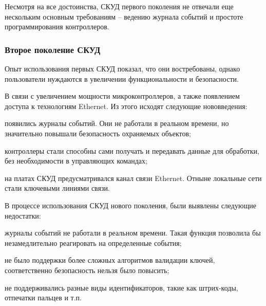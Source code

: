 Несмотря на все достоинства, СКУД первого поколения не отвечали еще нескольким основным требованиям -- ведению журнала событий и простоте программирования контроллеров.

\subsubsection{Второе поколение СКУД}

Опыт использования первых СКУД показал, что они востребованы, однако пользователи нуждаются в увеличении функциональности и безопасности.

В связи с увеличением мощности микроконтроллеров, а также появлением доступа к технологиям Ethernet. Из этого исходят следующие нововведения:

\begin{itemize*}
\item появились журналы событий. Они не работали в реальном времени, но значительно повышали безопасность охраняемых объектов;
\item контроллеры стали способны сами получать и передавать данные для обработки, без необходимости в управляющих командах;
\item на платах СКУД предусматривался канал связи Ethernet. Отныне локальные сети стали ключевыми линиями связи.
\end{itemize*}


В процессе использования СКУД нового поколения, были выявлены следующие недостатки:

\begin{itemize*}
\item журналы событий не работали в реальном времени. Такая функция позволила бы незамедлительно реагировать на определенные события;
\item не было поддержки более сложных алгоритмов валидации ключей, соответственно безопасность нельзя было повысить;
\item не поддерживались разные виды идентификаторов, такие как штрих-коды, отпечатки пальцев и т.п.
\end{itemize*}
